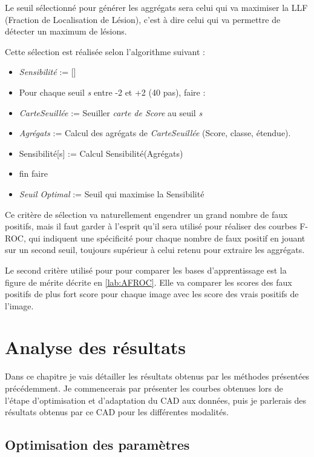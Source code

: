 Le seuil sélectionné pour générer les aggrégats sera celui qui va maximiser la LLF (Fraction de Localisation de Lésion), c'est à dire celui qui va permettre de détecter un maximum de lésions. 

Cette sélection est réalisée selon l'algorithme suivant :

\begin{itemize}
 \item \emph{Sensibilité} := []
 \item Pour chaque seuil \emph{s} entre -2 et +2 (40 pas), faire :
 \item \hspace{1cm}\emph{CarteSeuillée} := Seuiller \emph{carte de Score} au seuil \emph{s}
 \item \hspace{1cm}\emph{Agrégats} := Calcul des agrégats de \emph{CarteSeuillée} (Score, classe, étendue).
 \item \hspace{1cm}Sensibilité[s] := Calcul Sensibilité(Agrégats)
 \item fin faire
 \item \emph{Seuil Optimal} := Seuil qui maximise la Sensibilité
\end{itemize}

Ce critère de sélection va naturellement engendrer un grand nombre de faux positifs, mais il faut garder à l'esprit qu'il sera utilisé pour réaliser des courbes F-ROC, qui indiquent une spécificité pour chaque nombre de faux positif en jouant sur un second seuil, toujours supérieur à celui retenu pour extraire les aggrégats.

Le second critère utilisé pour pour comparer les bases d'apprentissage est la figure de mérite décrite en \ref{lab:AFROC}. Elle va comparer les scores des faux positifs de plus fort score pour chaque image avec les score  des vrais positifs de l'image.


\chapter{Analyse des résultats}

Dans ce chapitre je vais détailler les résultats obtenus par les méthodes présentées précédemment. Je commencerais par présenter les courbes obtenues lors de l'étape d'optimisation et d'adaptation du CAD aux données, puis je parlerais des résultats obtenus par ce CAD pour les différentes modalités.

\section{Optimisation des paramètres}

